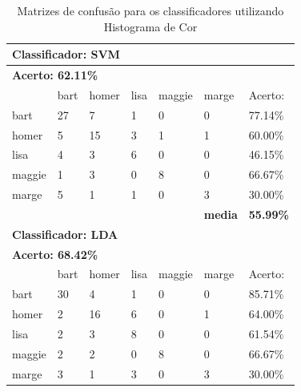 \documentclass[journal]{IEEEtran}
\begin{document}
\begin{table}[!htb]
\centering
\caption{Matrizes de confusão para os classificadores utilizando Histograma de Cor}
\label{tbl:colorhistogram}
\small
\singlespacing
\begin{tabular}{l|l|l|l|l|l|l}
\hline
\multicolumn{7}{l}{\textbf{Classificador: SVM}}                                                \\ \hline
\multicolumn{7}{l}{\textbf{Acerto: 62.11\%}}                                                  \\ \hline
          & bart      & homer     & lisa      & maggie    & marge          & Acerto:            \\ \hline
bart      & 27        & 7         & 1         & 0         & 0              & 77.14\%          \\ \hline
homer     & 5         & 15        & 3         & 1         & 1              & 60.00\%          \\ \hline
lisa      & 4         & 3         & 6         & 0         & 0              & 46.15\%          \\ \hline
maggie    & 1         & 3         & 0         & 8         & 0              & 66.67\%          \\ \hline
marge     & 5         & 1         & 1         & 0         & 3              & 30.00\%          \\ \hline
          &           &           & \textbf{} & \textbf{} & \textbf{media} & \textbf{55.99\%} \\ \hline
\multicolumn{7}{l}{\textbf{Classificador: LDA}}                                                \\ \hline
\multicolumn{7}{l}{\textbf{Acerto: 68.42\%}}                                                  \\ \hline
          & bart      & homer     & lisa      & maggie    & marge          & Acerto:            \\ \hline
bart      & 30        & 4         & 1         & 0         & 0              & 85.71\%          \\ \hline
homer     & 2         & 16        & 6         & 0         & 1              & 64.00\%          \\ \hline
lisa      & 2         & 3         & 8         & 0         & 0              & 61.54\%          \\ \hline
maggie    & 2         & 2         & 0         & 8         & 0              & 66.67\%          \\ \hline
marge     & 3         & 1         & 3         & 0         & 3              & 30.00\%          \\ \hline

\end{tabular}
\end{table}
\end{document}
